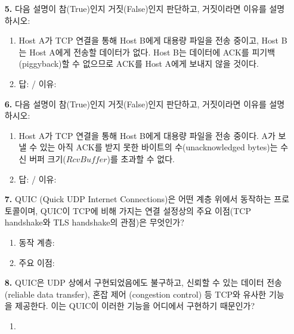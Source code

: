 \documentclass[a4paper, 10pt]{article}
\newcommand{\ansline}[1]{\underline{\hspace{#1}}}
\newcommand{\sectionbox}[1]{
  \vspace{0.5em}
  \noindent\fbox{\textbf{#1}}
  \vspace{0.5em}
}
\begin{document}
\begin{enumerate}[itemsep=2em, leftmargin=2em, label={}]
\item[\textbf{5.}] 다음 설명이 참(True)인지 거짓(False)인지 판단하고, 거짓이라면 이유를 설명하시오:
\begin{enumerate}[label={}, itemsep=0.3em, leftmargin=1.5em]
    \item Host A가 TCP 연결을 통해 Host B에게 대용량 파일을 전송 중이고, Host B는 Host A에게 전송할 데이터가 없다. Host B는 데이터에 ACK를 피기백(piggyback)할 수 없으므로 ACK를 Host A에게 보내지 않을 것이다.
    \item 답: \ansline{2cm} / 이유: \ansline{10cm}
\end{enumerate}

\item[\textbf{6.}] 다음 설명이 참(True)인지 거짓(False)인지 판단하고, 거짓이라면 이유를 설명하시오:
\begin{enumerate}[label={}, itemsep=0.3em, leftmargin=1.5em]
    \item Host A가 TCP 연결을 통해 Host B에게 대용량 파일을 전송 중이다. A가 보낼 수 있는 아직 ACK를 받지 못한 바이트의 수(unacknowledged bytes)는 수신 버퍼 크기($RcvBuffer$)를 초과할 수 없다.
    \item 답: \ansline{2cm} / 이유: \ansline{10cm}
\end{enumerate}

\item[\textbf{7.}] QUIC (Quick UDP Internet Connections)은 어떤 계층 위에서 동작하는 프로토콜이며, QUIC이 TCP에 비해 가지는 연결 설정상의 주요 이점(TCP handshake와 TLS handshake의 관점)은 무엇인가?
\begin{enumerate}[label=\alph*., itemsep=0.3em, leftmargin=1.5em]
    \item 동작 계층: \ansline{5cm}
    \item 주요 이점: \ansline{10cm}
\end{enumerate}

\item[\textbf{8.}] QUIC은 UDP 상에서 구현되었음에도 불구하고, 신뢰할 수 있는 데이터 전송 (reliable data transfer), 혼잡 제어 (congestion control) 등 TCP와 유사한 기능을 제공한다. 이는 QUIC이 이러한 기능을 어디에서 구현하기 때문인가?
\begin{enumerate}[label=\alph*., itemsep=0.3em, leftmargin=1.5em]
    \item \ansline{6cm}
\end{enumerate}


\item[] \sectionbox{II. Mux/Demux 및 Socket (5문제)}


\end{enumerate}
\end{document}
